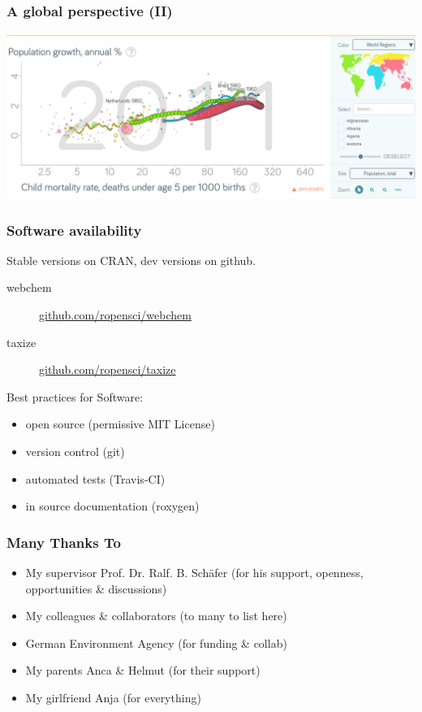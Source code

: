 \documentclass[
	10pt
	]{beamer}
\begin{document}
{%
\begin{frame}
\frametitle{A global perspective (II)}
	\includegraphics[width=1.1\textwidth, keepaspectratio]{figs/pop_mort.png}
\end{frame}
}


{%
\begin{frame}
\frametitle{Software availability}
	Stable versions on CRAN, dev versions on github.
	\begin{description}
		\item[webchem]{\url{github.com/ropensci/webchem}}
		\item[taxize]{\url{github.com/ropensci/taxize}}
	\end{description}
	\vspace{1em}

Best practices for Software:
	\begin{itemize}
		\item open source (permissive MIT License)
		\item version control (git)
		\item automated tests (Travis-CI)
		\item in source documentation (roxygen)
	\end{itemize}
\end{frame}
}

\begin{frame}
\frametitle{Many Thanks To}
	\begin{itemize}
		\item My supervisor \alert{Prof. Dr. Ralf. B. Schäfer} (for his support, openness, opportunities \& discussions)
		\item My \alert{colleagues \& collaborators} (to many to list here)
		\item \alert{{G}erman Environment Agency} (for funding \& collab)
		\item My parents \alert{Anca \& Helmut} (for their support)
		\item My girlfriend \alert{Anja} (for everything)
	\end{itemize}
\end{frame}


\end{document}
